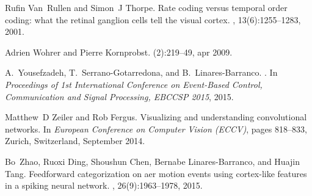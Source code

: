 \documentclass[preprint,5p,12pt,twocolumn]{article}
\begin{document}
\begin{thebibliography}{10}
Rufin Van~Rullen and Simon~J Thorpe.
\newblock Rate coding versus temporal order coding: what the retinal ganglion
  cells tell the visual cortex.
, 13(6):1255--1283, 2001.

Adrien Wohrer and Pierre Kornprobst.
(2):219--49, apr 2009.

A.~Yousefzadeh, T.~Serrano-Gotarredona, and B.~Linares-Barranco.
.
\newblock In {\em Proceedings of 1st International Conference on Event-Based
  Control, Communication and Signal Processing, EBCCSP 2015}, 2015.

Matthew~D Zeiler and Rob Fergus.
\newblock Visualizing and understanding convolutional networks.
\newblock In {\em European Conference on Computer Vision (ECCV)}, pages
  818--833, Zurich, Switzerland, September 2014.

Bo~Zhao, Ruoxi Ding, Shoushun Chen, Bernabe Linares-Barranco, and Huajin Tang.
\newblock Feedforward categorization on aer motion events using cortex-like
  features in a spiking neural network.
,
  26(9):1963--1978, 2015.

\end{thebibliography}
\end{document}
